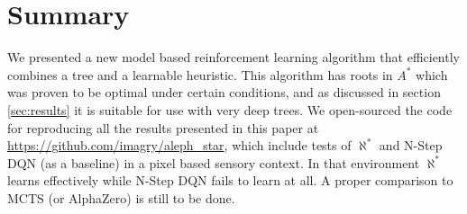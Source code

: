 \documentclass{article}
\newcommand{\alephstar}{$\aleph^*$ }
\newcommand{\astar}{$A^*$ }
\begin{document}
\section{Summary}
\label{sec:summary}

We presented a new model based reinforcement learning algorithm that efficiently combines a tree and a learnable heuristic. This algorithm has roots in \astar which was proven to be optimal under certain conditions, and as discussed in section \ref{sec:results} it is suitable for use with very deep trees. We open-sourced the code for reproducing all the results presented in this paper at \url{https://github.com/imagry/aleph_star}, which include tests of \alephstar and N-Step DQN (as a baseline) in a pixel based sensory context. In that environment \alephstar learns effectively while N-Step DQN fails to learn at all. A proper comparison to MCTS (or AlphaZero) is still to be done.


{

\small

}
\end{document}
